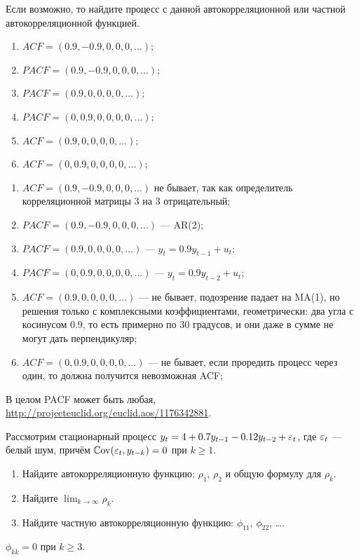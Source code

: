 \begin{problem}
Если возможно, то найдите процесс с данной автокорреляционной или частной автокорреляционной функцией.

\begin{enumerate}
  \item $ACF = (0.9, -0.9, 0, 0, 0, \ldots)$;
  \item $PACF = (0.9, -0.9, 0, 0, 0, \ldots)$;
  \item $PACF = (0.9, 0, 0, 0, 0, \ldots)$;
  \item $PACF = (0, 0.9, 0, 0, 0, 0, \ldots)$;
  \item $ACF = (0.9, 0, 0, 0, 0, \ldots)$;
  \item $ACF = (0, 0.9, 0, 0, 0, 0, \ldots)$;
\end{enumerate}

\begin{sol}
  \begin{enumerate}
    \item $ACF = (0.9, -0.9, 0, 0, 0, \ldots)$ не бывает, так как определитель корреляционной матрицы 3 на 3 отрицательный;
    \item $PACF = (0.9, -0.9, 0, 0, 0, \ldots)$ — AR(2);
    \item $PACF = (0.9, 0, 0, 0, 0, \ldots)$ — $y_t = 0.9y_{t-1} + u_t$;
    \item $PACF = (0, 0.9, 0, 0, 0, 0, \ldots)$ — $y_t = 0.9y_{t-2} + u_t$;
    \item $ACF = (0.9, 0, 0, 0, 0, \ldots)$ — не бывает, подозрение падает на MA(1), но решения только с комплексными коэффициентами, геометрически: два угла с косинусом 0.9, то есть примерно по 30 градусов, и они даже в сумме не могут дать перпендикуляр;
    \item $ACF = (0, 0.9, 0, 0, 0, 0, \ldots)$ — не бывает, если проредить процесс через один, то должна получится невозможная ACF;
  \end{enumerate}
   В целом PACF может быть любая,
   \url{http://projecteuclid.org/euclid.aos/1176342881}.
\end{sol}
\end{problem}


\begin{problem}
Рассмотрим стационарный процесс $y_t = 4 + 0.7y_{t-1} - 0.12y_{t-2} + \varepsilon_t$, где $\varepsilon_t$ — белый шум, причём $\operatorname{\mathbb{C}\mathrm{ov}}(\varepsilon_t, y_{t-k})=0$ при $k \geq 1$.

\begin{enumerate}
  \item Найдите автокорреляционную функцию: $\rho_1$, $\rho_2$ и общую формулу для $\rho_k$.
  \item Найдите $\lim_{k \to \infty} \rho_k$.
  \item Найдите частную автокорреляционную функцию: $\phi_{11}$, $\phi_{22}$, \ldots.
\end{enumerate}
\begin{sol}
  $\phi_{kk}=0$ при $k \geq 3$.
\end{sol}
\end{problem}



